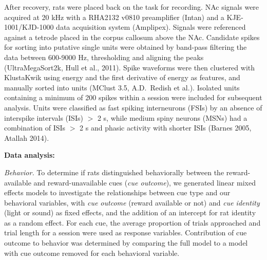 \documentclass[11pt]{article}
\begin{document}
After recovery, rats were placed back on the task for recording. NAc
signals were acquired at 20 kHz with a RHA2132 v0810 preamplifier
(Intan) and a KJE-1001/KJD-1000 data acquisition system
(Amplipex). Signals were referenced against a tetrode placed in the
corpus callosum above the NAc. Candidate spikes for sorting into
putative single units were obtained by band-pass filtering the data
between 600-9000 Hz, thresholding and aligning the peaks
(UltraMegaSort2k, Hull et al., 2011). Spike waveforms were then
clustered with KlustaKwik using energy and the first derivative of
energy as features, and manually sorted into units (MClust 3.5,
A.D.\ Redish et al.). Isolated units containing a minimum of 200
spikes within a session were included for subsequent analysis. Units
were classified as fast spiking interneurons (FSIs) by an absence of
interspike intervals (ISIs) $>$ 2 s, while medium spiny neurons (MSNs)
had a combination of ISIs $>$ 2 s and phasic activity with shorter
ISIs (Barnes 2005, Atallah 2014).

{\bf Data analysis:}

{\it Behavior.} To determine if rats distinguished behaviorally
between the reward-available and reward-unavailable cues ({\it cue
  outcome}), we generated linear mixed effects models to investigate
the relationships between cue type and our behavioral variables, with
{\it cue outcome} (reward available or not) and {\it cue identity}
(light or sound) as fixed effects, and the addition of an intercept
for rat identity as a random effect. For each cue, the average
proportion of trials approached and trial length for a session were
used as response variables. Contribution of cue outcome to behavior
was determined by comparing the full model to a model with cue outcome
removed for each behavioral variable.
\end{document}
